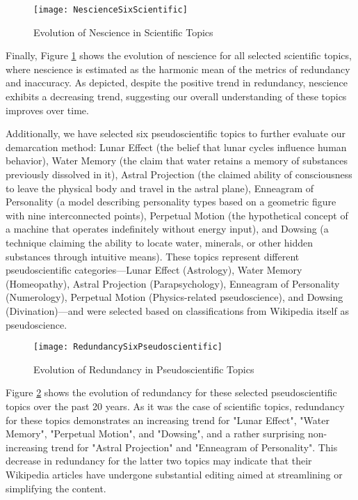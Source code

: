 \begin{figure}[H]
\centering\texttt{[image: NescienceSixScientific]}
\caption{\label{fig:nescience_six_scientific}Evolution of Nescience in Scientific Topics}
\end{figure}

Finally, Figure \ref{fig:nescience_six_scientific} shows the evolution of nescience for all selected scientific topics, where nescience is estimated as the harmonic mean of the metrics of redundancy and inaccuracy. As depicted, despite the positive trend in redundancy, nescience exhibits a decreasing trend, suggesting our overall understanding of these topics improves over time.

Additionally, we have selected six pseudoscientific topics to further evaluate our demarcation method: Lunar Effect (the belief that lunar cycles influence human behavior), Water Memory (the claim that water retains a memory of substances previously dissolved in it), Astral Projection (the claimed ability of consciousness to leave the physical body and travel in the astral plane), Enneagram of Personality (a model describing personality types based on a geometric figure with nine interconnected points), Perpetual Motion (the hypothetical concept of a machine that operates indefinitely without energy input), and Dowsing (a technique claiming the ability to locate water, minerals, or other hidden substances through intuitive means). These topics represent different pseudoscientific categories—Lunar Effect (Astrology), Water Memory (Homeopathy), Astral Projection (Parapsychology), Enneagram of Personality (Numerology), Perpetual Motion (Physics-related pseudoscience), and Dowsing (Divination)—and were selected based on classifications from Wikipedia itself as pseudoscience.

\begin{figure}[H]
\centering\texttt{[image: RedundancySixPseudoscientific]}
\caption{\label{fig:redundancy_six_pseudoscientific}Evolution of Redundancy in Pseudoscientific Topics}
\end{figure}

Figure \ref{fig:redundancy_six_pseudoscientific} shows the evolution of redundancy for these selected pseudoscientific topics over the past 20 years. As it was the case of scientific topics, redundancy for these topics demonstrates an increasing trend for "Lunar Effect", "Water Memory", "Perpetual Motion", and "Dowsing", and a rather surprising non-increasing trend for "Astral Projection" and "Enneagram of Personality". This decrease in redundancy for the latter two topics may indicate that their Wikipedia articles have undergone substantial editing aimed at streamlining or simplifying the content.

